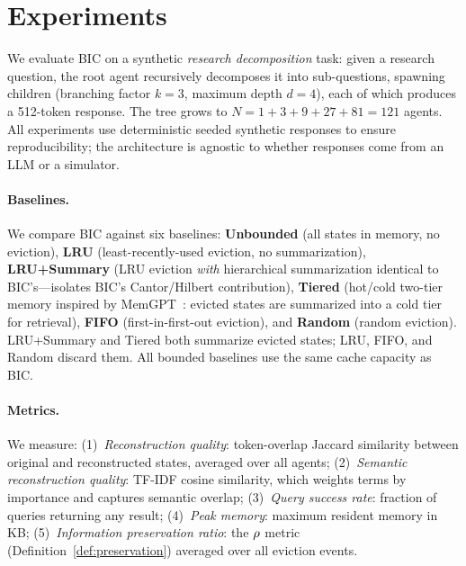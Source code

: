 
\section{Experiments}
\label{sec:experiments}

We evaluate BIC on a synthetic \emph{research decomposition} task:
given a research question, the root agent recursively decomposes it
into sub-questions, spawning children (branching factor $k{=}3$,
maximum depth $d{=}4$), each of which produces a 512-token response.
The tree grows to $N = 1 + 3 + 9 + 27 + 81 = 121$ agents.
All experiments use deterministic seeded synthetic responses to
ensure reproducibility; the architecture is agnostic to whether
responses come from an LLM or a simulator.

\paragraph{Baselines.}
We compare BIC against six baselines:
\textbf{Unbounded} (all states in memory, no eviction),
\textbf{LRU} (least-recently-used eviction, no summarization),
\textbf{LRU+Summary} (LRU eviction \emph{with} hierarchical
summarization identical to BIC's---isolates BIC's Cantor/Hilbert
contribution),
\textbf{Tiered} (hot/cold two-tier memory inspired by
MemGPT~\citep{packer2023memgpt}: evicted states are summarized into
a cold tier for retrieval),
\textbf{FIFO} (first-in-first-out eviction), and
\textbf{Random} (random eviction).
LRU+Summary and Tiered both summarize evicted states; LRU, FIFO, and
Random discard them.  All bounded baselines use the same cache
capacity as BIC.

\paragraph{Metrics.}
We measure: (1)~\emph{Reconstruction quality}: token-overlap Jaccard
similarity between original and reconstructed states, averaged over all
agents; (2)~\emph{Semantic reconstruction quality}: TF-IDF cosine
similarity, which weights terms by importance and captures semantic
overlap; (3)~\emph{Query success rate}: fraction of queries returning
any result; (4)~\emph{Peak memory}: maximum resident memory in KB;
(5)~\emph{Information preservation ratio}: the $\rho$ metric
(Definition~\ref{def:preservation}) averaged over all eviction events.

